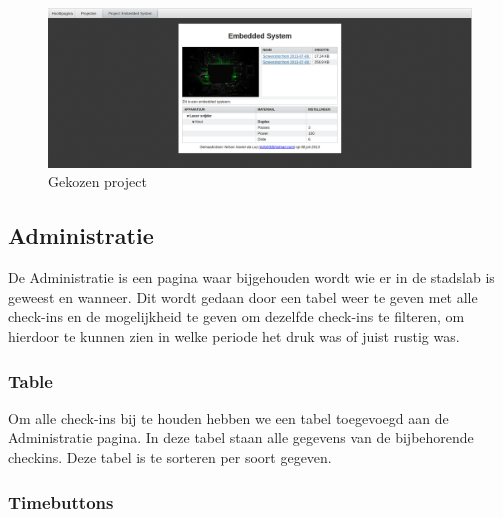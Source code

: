 \begin{figure}[Hh]
	\centering
	\includegraphics[width=1\textwidth]{Images/project.png}
	\caption{Gekozen project}
	\label{fig:chosen-project}
\end{figure}

\subsection{Administratie}
De Administratie is een pagina waar bijgehouden wordt wie er in de stadslab is geweest en wanneer. Dit wordt gedaan door een tabel weer te geven met alle check-ins en de mogelijkheid te geven om dezelfde check-ins te filteren, om hierdoor te kunnen zien in welke periode het druk was of juist rustig was.

\subsubsection{Table}

Om alle check-ins bij te houden hebben we een tabel toegevoegd aan de Administratie pagina. In deze tabel staan alle gegevens van de bijbehorende checkins. Deze tabel is te sorteren per soort gegeven.

\subsubsection{Timebuttons}


